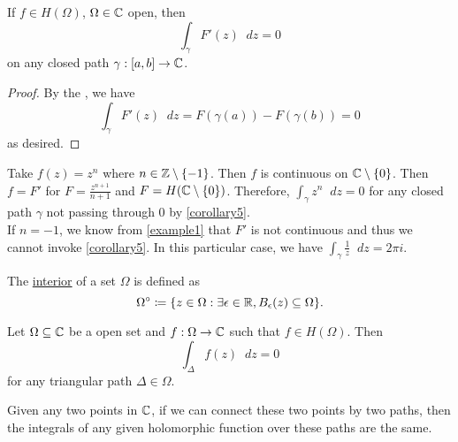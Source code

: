 \documentclass[11pt]{article}
\newcommand*\dif{\mathop{}\!d}
\begin{document}
\begin{corollary}
	If $f \in H(\Omega)$, $\Omega \in \mathbb{C}$ open, then
	\begin{equation*}
		\int_\gamma F'(z) \dif z = 0
	\end{equation*}
	on any closed path $\gamma: [a,b] \to \mathbb{C}$.
	\label{corollary5}
\end{corollary}
\begin{proof}
	By the , we have
	\begin{equation*}
		\int_\gamma F'(z) \dif z = F(\gamma(a)) - F(\gamma(b)) = 0
	\end{equation*}
	as desired.
\end{proof}
\begin{example}
	Take $f(z) = z^n$ where $n \in \mathbb{Z} \setminus \{-1\}$. Then $f$ is continuous on
	$\mathbb{C} \setminus \{0\}$. Then $f=F'$ for $F = \frac{z^{n+1}}{n+1}$ and $F =
	H(\mathbb{C} \setminus \{0\})$. Therefore, $\int_\gamma z^n\dif z = 0$ for any closed
	path $\gamma$ not passing through 0 by \cref{corollary5}.\\
	\indent
	If $n = -1$, we know from \cref{example1} that $F'$ is not continuous and thus
	we cannot invoke \cref{corollary5}. In this particular case, we have
	$\int_\gamma \frac{1}{z} \dif z = 2\pi i$.
\end{example}
\begin{definition}
	The \underline{interior} of a set $\Omega$ is defined as
	\begin{equation*}
		\Omega^\circ \coloneqq \{ z \in \Omega : \exists \epsilon\in\mathbb{R}, B_\epsilon(z)
		\subseteq \Omega\}.
	\end{equation*}
\end{definition}
\begin{theorem}
	Let $\Omega\subseteq\mathbb{C}$ be a open set and $f:\Omega\to\mathbb{C}$ such that $f \in
	H(\Omega)$. Then
	\begin{equation*}
		\int_\Delta f(z) \dif z = 0
	\end{equation*}
	for any triangular path $\Delta\in\Omega$.
	\label{theorem6}
\end{theorem}
\begin{remark}
	Given any two points in $\mathbb{C}$, if we can connect these two points by two paths,
	then the integrals of any given holomorphic function over these paths are the
	same.
\end{remark}
\end{document}
